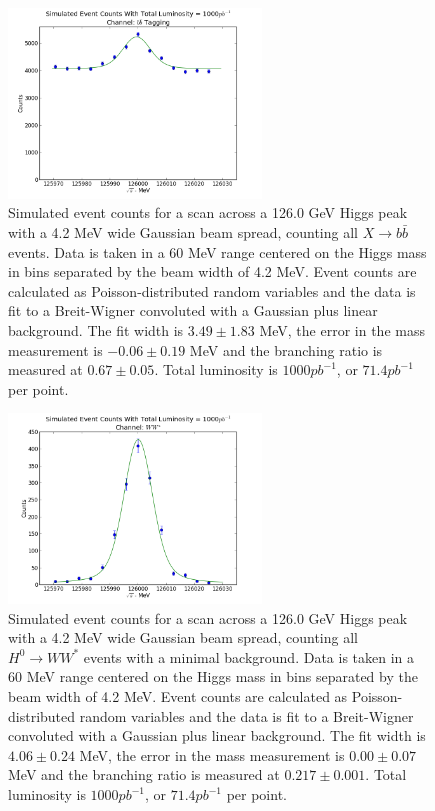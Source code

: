 \documentclass[a4paper]{article}
\begin{document}
\begin{figure}[H]
	\includegraphics[width=0.6\textwidth]{data-fit-bbbar-raw}
	\caption{Simulated event counts for a scan across a 126.0 GeV Higgs peak with a 4.2 MeV wide Gaussian beam spread, counting all $X\rightarrow b\bar{b}$ events. Data is taken in a 60 MeV range centered on the Higgs mass in bins separated by the beam width of 4.2 MeV. Event counts are calculated as Poisson-distributed random variables and the data is fit to a Breit-Wigner convoluted with a Gaussian plus linear background. The fit width is $3.49\pm1.83$ MeV, the error in the mass measurement is $-0.06\pm0.19$ MeV and the branching ratio is measured at $0.67\pm0.05$. Total luminosity is $1000pb^{-1}$, or $71.4 pb^{-1}$ per point.}
\label{data-fit-bbbar-raw}
\end{figure}

\begin{figure}[H]
	\includegraphics[width=0.6\textwidth]{data-fit-ww-raw}
	\caption{Simulated event counts for a scan across a 126.0 GeV Higgs peak with a 4.2 MeV wide Gaussian beam spread, counting all $H^0\rightarrow WW^*$ events with a minimal background. Data is taken in a 60 MeV range centered on the Higgs mass in bins separated by the beam width of 4.2 MeV. Event counts are calculated as Poisson-distributed random variables and the data is fit to a Breit-Wigner convoluted with a Gaussian plus linear background. The fit width is $4.06\pm0.24$ MeV, the error in the mass measurement is $0.00\pm0.07$ MeV and the branching ratio is measured at $0.217\pm0.001$. Total luminosity is $1000pb^{-1}$, or $71.4 pb^{-1}$ per point.}
\label{data-fit-ww-raw}
\end{figure}
\end{document}
